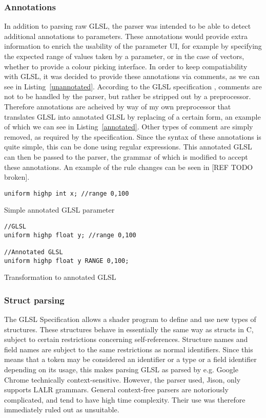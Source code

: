 \documentclass[12pt,twoside,notitlepage]{report}
\begin{document}
\subsubsection{Annotations}
\label{annotations}
In addition to parsing raw GLSL, the parser was intended to be able to detect additional annotations to parameters. These annotations would provide extra information to enrich the usability of the parameter UI, for example by specifying the expected range of values taken by a parameter, or in the case of vectors, whether to provide a colour picking interface. In order to keep compatiability with GLSL, it was decided to provide these annotations via comments, as we can see in Listing~\ref{unannotated}. According to the GLSL specification \cite{glsl-spec}, comments are not to be handled by the parser, but rather be stripped out by a preprocessor. Therefore annotations are acheived by way of my own preprocessor that translates GLSL into annotated GLSL by replacing of a certain form, an example of which we can see in Listing~\ref{annotated}. Other types of comment are simply removed, as required by the specification. Since the syntax of these annotations is quite simple, this can be done using regular expressions. This annotated GLSL can then be passed to the parser, the grammar of which is modified to accept these annotations. An example of the rule changes can be seen in [REF TODO broken].

\begin{listing}
\begin{verbatim}
uniform highp int x; //range 0,100
\end{verbatim}
\caption{Simple annotated GLSL parameter\label{unannotated}}
\end{listing}

\begin{listing}
\begin{verbatim}
//GLSL
uniform highp float y; //range 0,100

//Annotated GLSL
uniform highp float y RANGE 0,100;
\end{verbatim}
\caption{Transformation to annotated GLSL\label{annotated}}
\end{listing}

\subsubsection{Struct parsing}
\label{struct-parse}
The GLSL Specification \cite{glsl-spec} allows a shader program to define and use new types of structures. These structures behave in essentially the same way as structs in C, subject to certain restrictions concerning self-references. Structure names and field names are subject to the same restrictions as normal identifiers. Since this means that a token may be considered an identifier or a type or a field identifier depending on its usage, this makes parsing GLSL as parsed by e.g. Google Chrome technically context-sensitive. However, the parser used, Jison, only supports LALR grammars. General context-free parsers are notoriously complicated, and tend to have high time complexity. Their use was therefore immediately ruled out as unsuitable.
\end{document}
